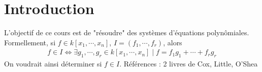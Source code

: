 \chapter*{Introduction}
    L'objectif de ce cours est de "résoudre" des systèmes d'équations polynômiales. Formellement, si $f \in k[x_1, \cdots, x_n]$, $I = (f_1, \cdots, f_r)$, alors 
    \begin{align*}
        f \in I \iff \exists g_1, \cdots, g_r \in k[x_1, \cdots, x_n] \mid f = f_1g_1 + \cdots + f_rg_r
    \end{align*}
    On voudrait ainsi déterminer si $f \in I$. Références : 2 livres de Cox, Little, O'Shea
